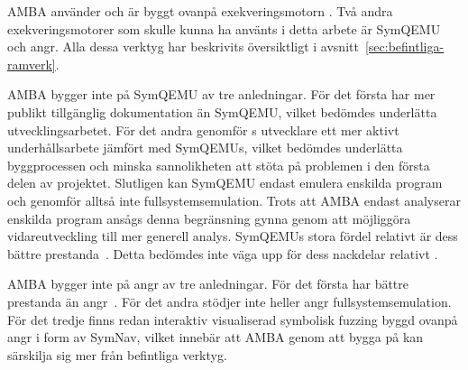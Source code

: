 AMBA använder och är byggt ovanpå exekveringsmotorn \stoe{}. Två andra
exekveringsmotorer som skulle kunna ha använts i detta arbete är SymQEMU och
angr. Alla dessa verktyg har beskrivits översiktligt i
avsnitt~\ref{sec:befintliga-ramverk}.

AMBA bygger inte på SymQEMU av tre anledningar. För det första har \stoe{} mer
publikt tillgänglig dokumentation än SymQEMU, vilket bedömdes underlätta
utvecklingsarbetet. För det andra genomför \stoe{}s utvecklare ett mer aktivt
underhållsarbete jämfört med SymQEMUs, vilket bedömdes underlätta byggprocessen
och minska sannolikheten att stöta på problemen i den första delen av projektet.
Slutligen kan SymQEMU endast emulera enskilda program och genomför alltså inte
fullsystemsemulation. Trots att AMBA endast analyserar enskilda program ansågs
denna begränsning gynna \stoe{} genom att möjliggöra vidareutveckling till mer
generell analys. SymQEMUs stora fördel relativt \stoe{} är dess bättre
prestanda~\cite{systematic_comparison_symbex}.  Detta bedömdes inte väga upp för
dess nackdelar relativt \stoe{}.

AMBA bygger inte på angr av tre anledningar. För det första har \stoe{} bättre
prestanda än angr~\cite{systematic_comparison_symbex}. För det andra stödjer
inte heller angr fullsystemsemulation. För det tredje finns redan interaktiv
visualiserad symbolisk fuzzing byggd ovanpå angr i form av SymNav, vilket
innebär att AMBA genom att bygga på \stoe{} kan särskilja sig mer från
befintliga verktyg.

